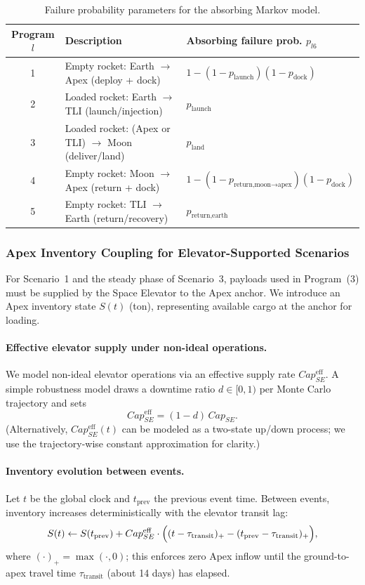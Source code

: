 ﻿\documentclass{mcmthesis}
\begin{document}
\begin{table}[htbp]
\centering
\caption{Failure probability parameters for the absorbing Markov model.}
\label{tab:failure_prob_task2}
\renewcommand{\arraystretch}{1.15}
\begin{tabular}{c l l}
\toprule
Program $l$ & Description & Absorbing failure prob. $p_{l6}$ \\
\midrule
1 & Empty rocket: Earth $\rightarrow$ Apex (deploy + dock) &
$1-(1-p_{\text{launch}})(1-p_{\text{dock}})$ \\
2 & Loaded rocket: Earth $\rightarrow$ TLI (launch/injection) &
$p_{\text{launch}}$ \\
3 & Loaded rocket: (Apex or TLI) $\rightarrow$ Moon (deliver/land) &
$p_{\text{land}}$ \\
4 & Empty rocket: Moon $\rightarrow$ Apex (return + dock) &
$1-(1-p_{\text{return,moon}\rightarrow \text{apex}})(1-p_{\text{dock}})$ \\
5 & Empty rocket: TLI $\rightarrow$ Earth (return/recovery) &
$p_{\text{return,earth}}$ \\
\bottomrule
\end{tabular}
\end{table}

\subsubsection{Apex Inventory Coupling for Elevator-Supported Scenarios}
\label{sec:model2_inventory}

For Scenario~1 and the steady phase of Scenario~3, payloads used in Program~(3) must be supplied by the Space
Elevator to the Apex anchor. We introduce an Apex inventory state $S(t)$ (ton), representing available cargo
at the anchor for loading.

\paragraph{Effective elevator supply under non-ideal operations.}
We model non-ideal elevator operations via an effective supply rate $Cap_{SE}^{\text{eff}}$.
A simple robustness model draws a downtime ratio $d\in[0,1)$ per Monte Carlo trajectory and sets
\[
Cap_{SE}^{\text{eff}}=(1-d)\,Cap_{SE}.
\]
(Alternatively, $Cap_{SE}^{\text{eff}}(t)$ can be modeled as a two-state up/down process; we use the
trajectory-wise constant approximation for clarity.)

\paragraph{Inventory evolution between events.}
Let $t$ be the global clock and $t_{\text{prev}}$ the previous event time. Between events, inventory increases
deterministically with the elevator transit lag:
\[
S(t)\leftarrow S(t_{\text{prev}}) + Cap_{SE}^{\text{eff}}\cdot \Bigl((t-\tau_{\text{transit}})_+ - (t_{\text{prev}}-\tau_{\text{transit}})_+\Bigr),
\]
where $(\cdot)_+=\max(\cdot,0)$; this enforces zero Apex inflow until the ground-to-apex travel time
$\tau_{\text{transit}}$ (about 14 days) has elapsed.
\end{document}
